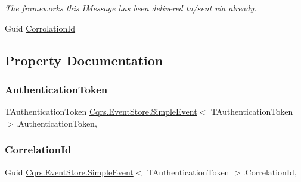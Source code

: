 \begin{DoxyCompactItemize}
\begin{DoxyCompactList}\small\item\em The frameworks this I\+Message has been delivered to/sent via already. \end{DoxyCompactList}\item 
Guid \hyperlink{classCqrs_1_1EventStore_1_1SimpleEvent_a1f0f55ac94ac408f10ad2fd8b3843ddf}{Corrolation\+Id}
\end{DoxyCompactItemize}


\subsection{Property Documentation}
\mbox{\label{classCqrs_1_1EventStore_1_1SimpleEvent_a91ca9d263c41a4b5ffc30f9245aa6fe9}} 
\subsubsection{\texorpdfstring{Authentication\+Token}{AuthenticationToken}}
{\footnotesize\ttfamily T\+Authentication\+Token \hyperlink{classCqrs_1_1EventStore_1_1SimpleEvent}{Cqrs.\+Event\+Store.\+Simple\+Event}$<$ T\+Authentication\+Token $>$.Authentication\+Token\hspace{0.3cm}{\ttfamily [get]}, {\ttfamily [set]}}

\mbox{\label{classCqrs_1_1EventStore_1_1SimpleEvent_aa96b900b0fef8e6b2f6af81b5ce99f16}} 
\subsubsection{\texorpdfstring{Correlation\+Id}{CorrelationId}}
{\footnotesize\ttfamily Guid \hyperlink{classCqrs_1_1EventStore_1_1SimpleEvent}{Cqrs.\+Event\+Store.\+Simple\+Event}$<$ T\+Authentication\+Token $>$.Correlation\+Id\hspace{0.3cm}{\ttfamily [get]}, {\ttfamily [set]}}

